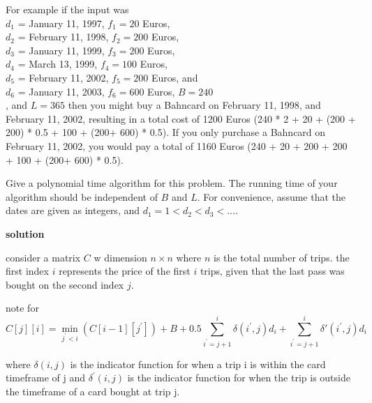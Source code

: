 \documentclass[letterpaper,12pt]{article}
\begin{document}
\begin{enumerate}
For example if the input was \\
$d_1$ = January 11, 1997, $f_1=20$ Euros, \\
$d_2$ = February 11, 1998, $f_2=200$ Euros, \\
$d_3$ = January 11, 1999, $f_3=200$ Euros, \\
$d_4$ = March 13, 1999, $f_4=100$ Euros, \\
$d_5$ = February 11, 2002, $f_5=200$ Euros, and \\
$d_6$ = January 11, 2003, $f_6=600$ Euros, $B=240$\\
, and $L=365$ then
you might buy a Bahncard on February 11, 1998, and
February 11, 2002, resulting in a total cost of
1200 Euros (240 * 2 + 20 + (200 + 200) * 0.5 + 100 + (200+ 600) * 0.5). If you only purchase a Bahncard on 
February 11, 2002, you would pay a total of 1160 Euros (240 + 20 + 200 + 200 + 100 + (200+ 600) * 0.5).
 
Give a polynomial time algorithm for this problem.
The running time of your algorithm should be independent of
$B$ and $L$. For convenience, assume that the dates are given as integers, and 
$d_1 = 1 < d_2 < d_3 < \ldots$. 



\textbf{solution}

consider a matrix \(C\) w dimension \(n\times n\) where \(n\) is the total number of trips. the first index \(i\) represents the price of the first \(i\) trips, given that the last pass was bought on the second index \(j\). 

note for 
\begin{equation}
    C[j][i] = \min_{j^\prime < i}(C[i-1][j^\prime]) + B + 0.5 \sum_{i^\prime=j+1}^{i}\delta(i^\prime,j) d_i + \sum_{i^\prime=j+1}^{i}\delta'(i^\prime,j) d_i 
\end{equation}

where \(\delta(i,j)\) is the indicator function for when a trip i is within the card timeframe of j and \(\delta^\prime(i,j)\) is the indicator function for when the trip is outside the timeframe of a card bought at trip j.


\end{enumerate}
\end{document}
